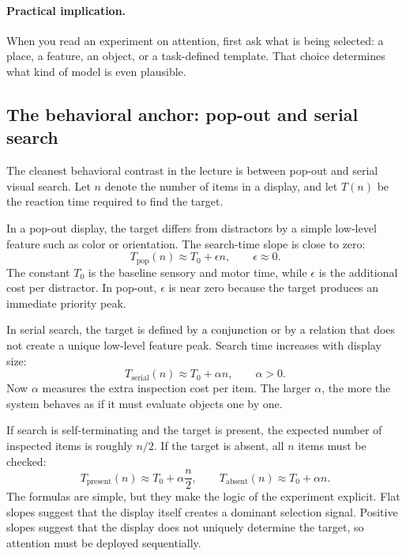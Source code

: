 \paragraph{Practical implication.}
When you read an experiment on attention, first ask what is being selected: a place, a feature, an object, or a task-defined template. That choice determines what kind of model is even plausible.

\subsection{The behavioral anchor: pop-out and serial search}

The cleanest behavioral contrast in the lecture is between pop-out and serial visual search. Let \(n\) denote the number of items in a display, and let \(T(n)\) be the reaction time required to find the target.

In a pop-out display, the target differs from distractors by a simple low-level feature such as color or orientation. The search-time slope is close to zero:
\[
T_{\mathrm{pop}}(n) \approx T_0 + \epsilon n,
\qquad
\epsilon \approx 0.
\]
The constant \(T_0\) is the baseline sensory and motor time, while \(\epsilon\) is the additional cost per distractor. In pop-out, \(\epsilon\) is near zero because the target produces an immediate priority peak.

In serial search, the target is defined by a conjunction or by a relation that does not create a unique low-level feature peak. Search time increases with display size:
\[
T_{\mathrm{serial}}(n) \approx T_0 + \alpha n,
\qquad
\alpha > 0.
\]
Now \(\alpha\) measures the extra inspection cost per item. The larger \(\alpha\), the more the system behaves as if it must evaluate objects one by one.

If search is self-terminating and the target is present, the expected number of inspected items is roughly \(n/2\). If the target is absent, all \(n\) items must be checked:
\[
T_{\mathrm{present}}(n) \approx T_0 + \alpha \frac{n}{2},
\qquad
T_{\mathrm{absent}}(n) \approx T_0 + \alpha n.
\]
The formulas are simple, but they make the logic of the experiment explicit. Flat slopes suggest that the display itself creates a dominant selection signal. Positive slopes suggest that the display does not uniquely determine the target, so attention must be deployed sequentially.

